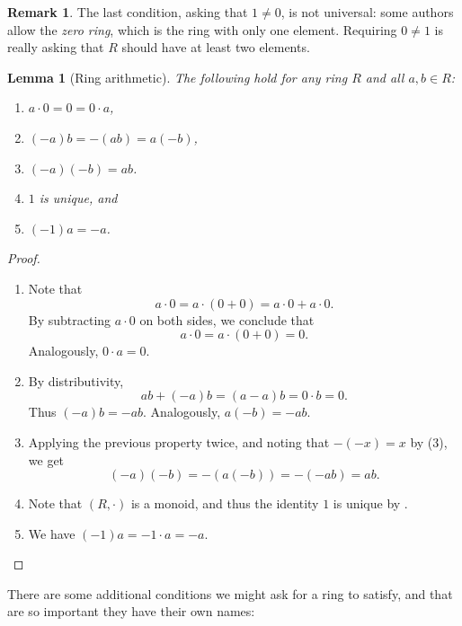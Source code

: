 \documentclass[12pt]{report}
\newtheorem{lemma}[theorem]{Lemma}
\numberwithin{equation}{section}
\numberwithin{theorem}{chapter}
\theoremstyle{definition}
\newtheorem*{basic properties}{Basic Properties}
\newtheorem*{Important Remark}{Important Remark}
\newtheorem{remark}[theorem]{Remark}
\begin{document}
\begin{remark}
	The last condition, asking that $1 \neq 0$, is not universal: some authors allow the \emph{zero ring}, which is the ring with only one element. Requiring $0 \neq 1$ is really asking that $R$ should have at least two elements.
\end{remark}

 
 
\begin{lemma}[Ring arithmetic] 
The following hold for any ring $R$ and all $a,b \in R$:
\begin{enumerate}[itemsep=0.1mm]
\item $a \cdot 0 = 0 = 0 \cdot a$,
\item $(-a)b = -(ab) = a(-b)$,
\item $(-a)(-b) = ab$.
\item $1$ is unique, and
\item $(-1)a = -a$.
\end{enumerate}
\end{lemma}


\begin{proof}
	\begin{enumerate}[itemsep=0.1mm]
	\item Note that
	$$a \cdot 0 = a \cdot (0+0) = a \cdot 0 + a \cdot 0.$$
	By subtracting $a \cdot 0$ on both sides, we conclude that
	$$a \cdot 0 = a \cdot (0+0) = 0.$$
	Analogously, $0 \cdot a = 0$.
	\item By distributivity,
	$$ab + (-a)b = (a-a)b = 0 \cdot b = 0.$$
	Thus $(-a)b = -ab$. Analogously, $a(-b) = -ab$.
	\item Applying the previous property twice, and noting that $-(-x)=x$ by  (3), we get
	$$(-a)(-b) = -(a(-b)) = -(-ab) = ab.$$
	\item Note that $(R, \cdot)$ is a monoid, and thus the identity $1$ is unique by .
	\item We have $(-1)a = - 1 \cdot a = -a$.\qedhere
	\end{enumerate}
\end{proof}



There are some additional conditions we might ask for a ring to satisfy, and that are so important they have their own names:
\end{document}
